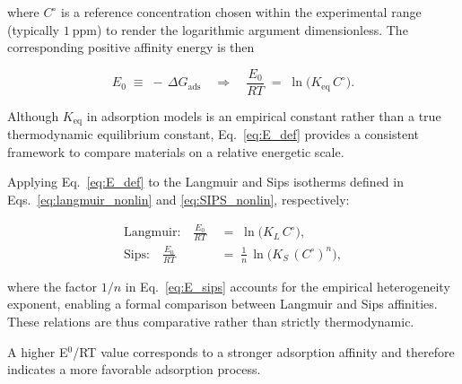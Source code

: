 \documentclass[journal=jacsat,manuscript=article]{achemso}
\begin{document}
where \(C^\circ\) is a reference concentration chosen within the experimental range (typically \(1~\mathrm{ppm}\)) to render the logarithmic argument dimensionless. The corresponding positive affinity energy is then

\begin{equation}
	E_0 \;\equiv\; -\,\Delta G_{\mathrm{ads}}
	\quad\Rightarrow\quad
	\frac{E_0}{RT} \;=\; \ln\!\big(K_{\mathrm{eq}}\,C^\circ\big).
	\label{eq:E_def}
\end{equation}

Although \(K_{\mathrm{eq}}\) in adsorption models is an empirical constant rather than a true thermodynamic equilibrium constant, Eq.~\eqref{eq:E_def} provides a consistent framework to compare materials on a relative energetic scale.

Applying Eq.~\eqref{eq:E_def} to the Langmuir and Sips isotherms defined in Eqs.~\eqref{eq:langmuir_nonlin} and \eqref{eq:SIPS_nonlin}, respectively:

\begin{align}
	\text{Langmuir:}\quad 
	\frac{E_0}{RT} \;&=\; \ln\!\big(K_L\,C^\circ\big),
	\label{eq:E_langmuir}\\[6pt]
	\text{Sips:}\quad 
	\frac{E_0}{RT} \;&=\; \frac{1}{n}\,\ln\!\big(K_S\,(C^\circ)^{n}\big),
	\label{eq:E_sips}
\end{align}

where the factor \(1/n\) in Eq.~\eqref{eq:E_sips} accounts for the empirical heterogeneity exponent, enabling a formal comparison between Langmuir and Sips affinities. These relations are thus comparative rather than strictly thermodynamic.

A higher E$^0$/RT value corresponds to a stronger adsorption affinity and therefore indicates a more favorable adsorption process.

\end{document}
